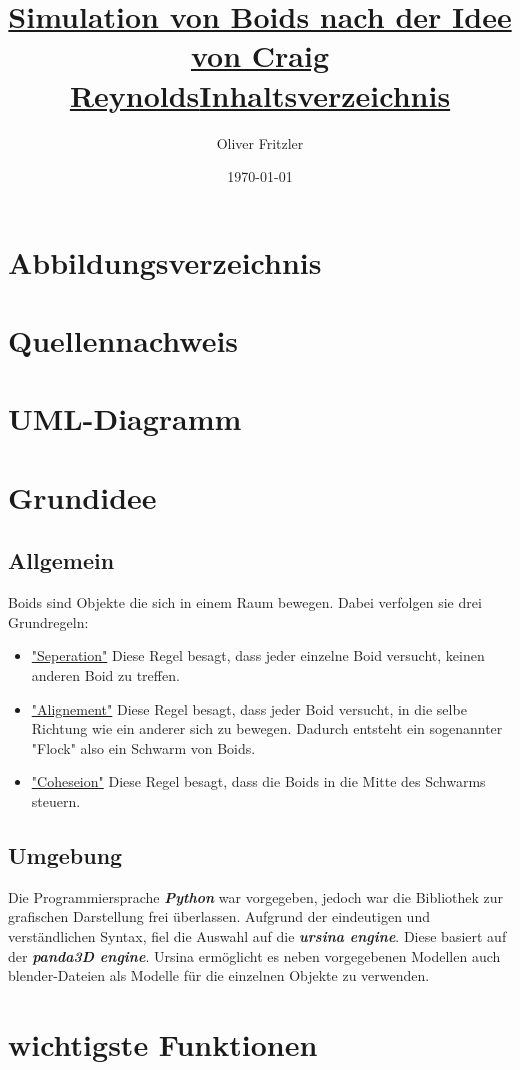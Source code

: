 \documentclass[a4paper, 12pt]{article}
\begin{document}
	\begin{titlepage}
		\title{\Large{\textbf{\underline{Simulation von Boids nach der Idee von Craig Reynolds}}}}
		\author{Oliver Fritzler}
		\date{\today}
		\maketitle
	\end{titlepage}
	\title{\Large{\textbf{\underline{Inhaltsverzeichnis}}}}
	\tableofcontents
	\newpage
	\section{Abbildungsverzeichnis}
	\newpage
	\section{Quellennachweis}
	\newpage
	\section{UML-Diagramm}
	\newpage
	\section{Grundidee}
	\subsection{Allgemein}
		Boids sind Objekte die sich in einem Raum bewegen. Dabei verfolgen sie drei Grundregeln:
		\begin{itemize}
			\item\underline{"Seperation"}\linebreak
			Diese Regel besagt, dass jeder einzelne Boid versucht, keinen anderen Boid zu treffen. 
			\item\underline{"Alignement"}\linebreak
			Diese Regel besagt, dass jeder Boid versucht, in die selbe Richtung wie ein anderer sich zu bewegen. Dadurch entsteht ein sogenannter "Flock" also ein Schwarm von Boids.
			\item\underline{"Coheseion"}\linebreak
			Diese Regel besagt, dass die Boids in die Mitte des Schwarms steuern.
		\end{itemize}
	\subsection{Umgebung}
		Die Programmiersprache \emph{\textbf{Python}} war vorgegeben, jedoch war die Bibliothek zur grafischen Darstellung frei überlassen. Aufgrund der eindeutigen und verständlichen Syntax, fiel die Auswahl auf die \emph{\textbf{ursina engine}}. Diese basiert auf der \emph{\textbf{panda3D engine}}. Ursina ermöglicht es neben vorgegebenen Modellen auch blender-Dateien als Modelle für die einzelnen Objekte zu verwenden. 
	\newpage
	\section{wichtigste Funktionen}
	\newpage
\end{document}
